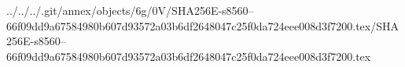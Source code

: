 ../../../.git/annex/objects/6g/0V/SHA256E-s8560--66f09dd9a67584980b607d93572a03b6df2648047c25f0da724eee008d3f7200.tex/SHA256E-s8560--66f09dd9a67584980b607d93572a03b6df2648047c25f0da724eee008d3f7200.tex